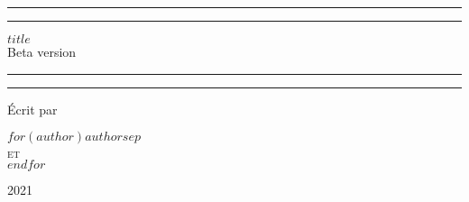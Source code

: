 \documentclass{book}
\begin{document}
\begin{titlepage} %
	\centering %
	\scshape %
	\vspace*{\baselineskip} %
	\rule{\textwidth}{1.6pt}\vspace*{-\baselineskip}\vspace*{2pt} %
	\rule{\textwidth}{0.4pt} %
	\vspace{0.75\baselineskip} %

	{\Huge $title$}\\[20pt]

	{\LARGE Beta version \\}

	\vspace{1\baselineskip} %
	\rule{\textwidth}{0.4pt}\vspace*{-\baselineskip}\vspace{3.2pt} %
	\rule{\textwidth}{1.6pt} %
	\vspace{2\baselineskip} %


	\vspace*{3\baselineskip} %

	Écrit par

	\vspace{0.5\baselineskip} %
	{\scshape\Large $for(author)$$author$$sep$ \vspace{0.3\baselineskip} \\[10pt] et \\[10pt]
   \vspace{0.3\baselineskip} $endfor$} %

	\vspace{0.5\baselineskip} %

	\vfill %

	\vspace{0.3\baselineskip} %
	2021 %


\end{titlepage}
\end{document}
